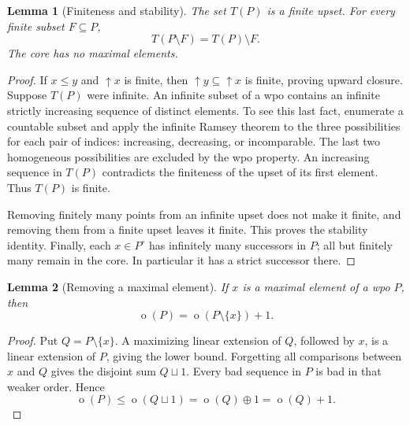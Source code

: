\documentclass[11pt,a4paper]{article}
\newtheorem{lemma}[lemma]{Lemma}
\theoremstyle{definition}
\theoremstyle{remark}
\DeclareMathOperator{\mot}{o}
\newcommand{\core}[1]{{#1}^{\circ}}
\newcommand{\ds}{\mathbin{\sqcup}}
\begin{document}
\begin{lemma}[Finiteness and stability]\label{lem:tailfinite}
The set $T(P)$ is a finite upset. For every finite subset $F\subseteq P$,
\[
T(P\setminus F)=T(P)\setminus F.
\]
The core has no maximal elements.
\end{lemma}
\begin{proof}
If $x\leq y$ and $\uparrow x$ is finite, then
$\uparrow y\subseteq\uparrow x$ is finite, proving upward closure.
Suppose $T(P)$ were infinite. An infinite subset of a wpo contains an
infinite strictly increasing sequence of distinct elements. To see this
last fact, enumerate a countable subset and apply the infinite Ramsey
theorem to the three possibilities for each pair of indices: increasing,
decreasing, or incomparable. The last two homogeneous possibilities are
excluded by the wpo property. An increasing sequence in $T(P)$ contradicts
the finiteness of the upset of its first element. Thus $T(P)$ is finite.

Removing finitely many points from an infinite upset does not make it
finite, and removing them from a finite upset leaves it finite. This proves
the stability identity. Finally, each $x\in\core{P}$ has infinitely many
successors in $P$; all but finitely many remain in the core. In particular
it has a strict successor there.
\end{proof}

\begin{lemma}[Removing a maximal element]\label{lem:maxdelete}
If $x$ is a maximal element of a wpo $P$, then
\[
\mot(P)=\mot(P\setminus\{x\})+1.
\]
\end{lemma}
\begin{proof}
Put $Q=P\setminus\{x\}$. A maximizing linear extension of $Q$, followed
by $x$, is a linear extension of $P$, giving the lower bound. Forgetting
all comparisons between $x$ and $Q$ gives the disjoint sum $Q\ds1$.
Every bad sequence in $P$ is bad in that weaker order. Hence
\[
\mot(P)\leq\mot(Q\ds1)=\mot(Q)\oplus1=\mot(Q)+1.
\]
\end{proof}
\end{document}
